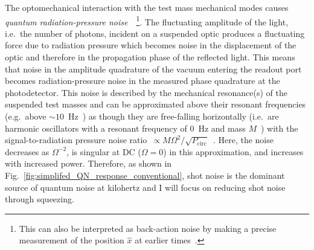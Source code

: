 
The optomechanical interaction with the test mass mechanical modes causes \emph{quantum radiation-pressure noise}~\cite{PhysRevD.23.1693}~\footnote{This can also be interpreted as back-action noise by making a precise measurement of the position $\hat x$ at earlier times~\cite{danilishinQuantumMeasurementTheory2012}.}.
The fluctuating amplitude of the light, i.e.\ the number of photons, incident on a suspended optic produces a fluctuating force due to radiation pressure which becomes noise in the displacement of the optic and therefore in the propagation phase of the reflected light. %
This means that noise in the amplitude quadrature of the vacuum entering the readout port becomes radiation-pressure noise in the measured phase quadrature at the photodetector.
This noise is described by the mechanical resonance(s) of the suspended test masses and can be approximated above their resonant frequencies (e.g.\ above $\sim10$~Hz~\cite{PhysRevLett.116.131103}) as though they are free-falling horizontally (i.e.\ are harmonic oscillators with a resonant frequency of 0~Hz and mass $M$~\cite{PhysRevLett.116.131103}) with the signal-to-radiation pressure noise ratio~$\propto M\Omega^2/\sqrt{P_\text{circ}}$~\cite{corbitt_2003}.
Here, the noise decreases as $\Omega^{-2}$, is singular at DC ($\Omega=0$) in this approximation, and increases with increased power. %
Therefore, as shown in Fig.~\ref{fig:simplifed_QN_response_conventional}, shot noise is the dominant source of quantum noise at kilohertz and I will focus on reducing shot noise through squeezing.
